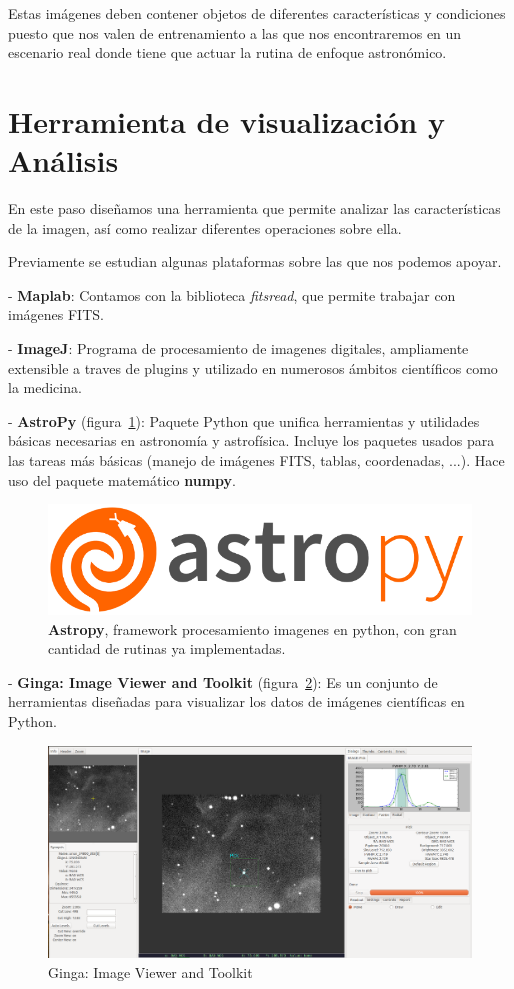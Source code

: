 Estas imágenes deben contener objetos de diferentes características y condiciones puesto que nos valen de entrenamiento a las que nos encontraremos en un escenario real donde tiene que actuar la rutina de enfoque astronómico. 


\section{Herramienta de visualización y Análisis}

En este paso diseñamos una herramienta que permite analizar las características de la imagen,  así como realizar diferentes operaciones sobre ella.

Previamente se estudian algunas plataformas sobre las que nos podemos apoyar.


- \textbf{Maplab}: Contamos con la biblioteca \textit{fitsread}, que permite trabajar con imágenes FITS.


- \textbf{ImageJ}: Programa de procesamiento de imagenes digitales, ampliamente extensible a traves de plugins y utilizado en numerosos ámbitos científicos como la medicina.   


- \textbf{AstroPy} \cite{astropy} (figura~\ref{fig:astropy}): Paquete Python que unifica herramientas y utilidades básicas necesarias en astronomía y astrofísica. Incluye los paquetes usados para las tareas más básicas (manejo de imágenes FITS, tablas, coordenadas, ...). Hace uso del paquete matemático \textbf{numpy}.

\begin{figure}[h]
	\centering
	\includegraphics[width=0.8\linewidth]{../images/astropy}
	\caption[Logo Astropy]{\textbf{Astropy}, framework procesamiento imagenes en python, con gran cantidad de rutinas ya implementadas.}
	\label{fig:astropy}
\end{figure}


- \textbf{Ginga: Image Viewer and Toolkit} (figura~\ref{fig:ginga}): Es un conjunto de herramientas diseñadas para visualizar los  datos de imágenes científicas en Python.

\begin{figure}[h]
	\centering
	\includegraphics[width=1\linewidth]{../images/ginga}
	\caption{Ginga: Image Viewer and Toolkit}
	\label{fig:ginga}
\end{figure}

